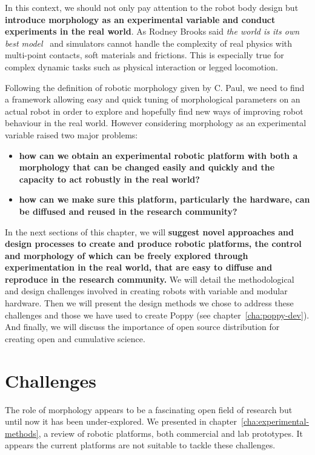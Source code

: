 In this context, we should not only pay attention to the robot body design but \textbf{introduce morphology as an experimental variable and conduct experiments in the real world}. As Rodney Brooks said \emph{the world is its own best model}~\parencite{brooks1991intelligence} and simulators cannot handle the complexity of real physics with multi-point contacts, soft materials and frictions. This is especially true for complex dynamic tasks such as physical interaction or legged locomotion.

Following the definition of robotic morphology given by C. Paul, we need to find a framework allowing easy and quick tuning of morphological parameters on an actual robot in order to explore and hopefully find new ways of improving robot behaviour in the real world. However considering morphology as an experimental variable raised two major problems:
\begin{itemize}
    \item \textbf{how can we obtain an experimental robotic platform with both a morphology that can be changed easily and quickly and the capacity to act robustly in the real world? }
    \item \textbf{how can we make sure this platform, particularly the hardware, can be diffused and reused in the research community?}
\end{itemize}

In the next sections of this chapter, we will \textbf{suggest novel approaches and design processes to create and produce robotic platforms, the control and morphology of which can be freely explored through experimentation in the real world,  that are easy to  diffuse and reproduce in the research community.}
We will detail the methodological and design challenges involved in creating robots with variable and modular hardware. Then we will present the design methods we chose to address these challenges and those we have used to create Poppy (see chapter~\ref{cha:poppy-dev}). And finally, we will discuss the importance of open source distribution for creating open and cumulative science.


\section{Challenges} %

The role of morphology appears to be a fascinating open field of research but until now it has been under-explored.
We presented in chapter~\ref{cha:experimental-methods}, a review of robotic platforms, both commercial and lab prototypes. It appears the current platforms are not suitable to tackle these challenges.

